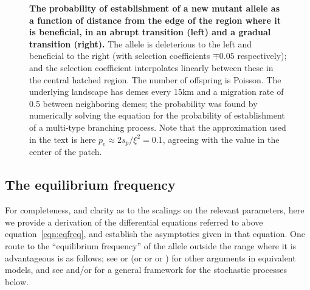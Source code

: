 \documentclass[10pt,letterpaper]{article}
\newcommand{\citet}[1]{\cite{#1}}
\begin{document}
\begin{figure}[ht!]
    \begin{center}
    \end{center}
    \caption{
        \textbf{The probability of establishment of a new mutant allele as a function of distance from the edge of the region where it is beneficial,
        in an abrupt transition (left) and a gradual transition (right).}
    The allele is deleterious to the left and beneficial to the right (with selection coefficients $\mp 0.05$ respectively);
    and the selection coefficient interpolates linearly between these in the central hatched region.
    The number of offspring is Poisson.
    The underlying landscape has demes every 15km and a migration rate of 0.5 between neighboring demes;
    the probability was found by numerically solving the equation for the probability of establishment of a multi-type branching process.
    Note that the approximation used in the text is here $p_e \approx 2 s_p / \xi^2 = 0.1$,
    agreeing with the value in the center of the patch.
    \label{fig:prob_estab_calcs}
    }
\end{figure}



\subsection*{The equilibrium frequency}
\label{apx:eqfreq}

For completeness, and clarity as to the scalings on the relevant parameters,
here we provide a derivation of the differential equations referred to above equation~\eqref{eqn:eqfreq},
and establish the asymptotics given in that equation.
One route to the ``equilibrium frequency'' of the allele outside the range where it is advantageous is as follows;
see \citet{slatkin1973geneflow} or \citet{barton1987establishment}
(or \citet{KPP1937book} or \citet{fisher1937wave} or \citet{haldane1948theory})
for other arguments in equivalent models,
and see \citet{etheridge2000introduction} and/or \citet{dawson1993measurevalued} for a general framework for the stochastic processes below.
\end{document}
